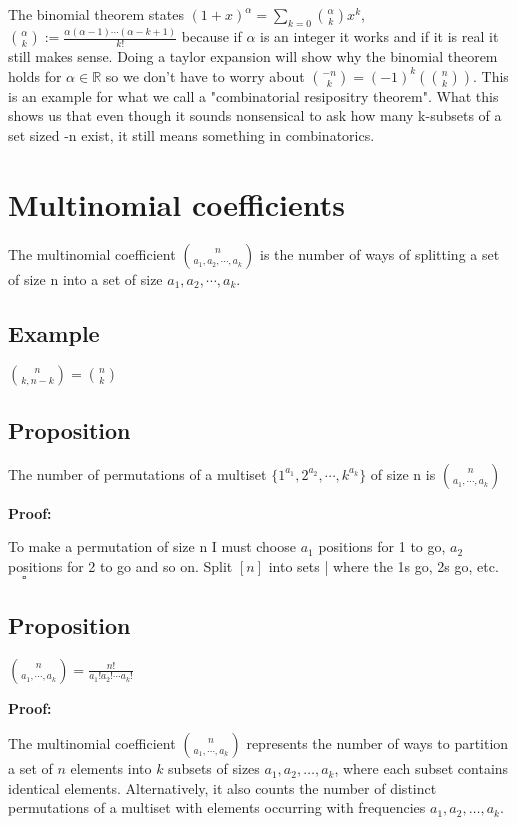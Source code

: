 \documentclass[12pt]{article}
\begin{document}
\noindent 
The binomial theorem states \((1+x)^\alpha = \sum_{k=0} \binom{\alpha}{k}x^k\),
\(\binom{\alpha}{k} := \frac{\alpha(\alpha - 1) \cdots (\alpha-k+1)}{k!} \)
because if \(\alpha\) is an integer it works and if it is real it still makes sense.
Doing a taylor expansion will show why the 
binomial theorem holds for \(\alpha \in \mathbb R\) so we don't have to worry 
about \(\binom{-n}{k} = (-1)^k (\binom{n}{k})\).
This is an example for what we call a "combinatorial resipositry theorem". 
What this shows us that even though it sounds nonsensical to ask how many 
k-subsets of a set sized -n exist, it still means something in combinatorics.

\section{Multinomial coefficients}
The multinomial coefficient \(\binom{n}{a_1, a_2, \cdots, a_k}\)
is the number of ways of splitting a set of size n into a set of size 
\(a_1, a_2, \cdots, a_k \). 

\subsection*{Example}
\(\binom{n}{k, n-k} = \binom{n}{k}\)

\subsection*{Proposition}
The number of permutations of a multiset 
\(\{1^{a_1}, 2^{a_2}, \cdots, k^{a_k}\}\) of size n is 
\(\binom{n}{a_1, \cdots, a_k}\)

\noindent 
\textbf{Proof:}

\noindent 
To make a permutation of size n I must choose $a_1$ positions for 1 to go,  
$a_2$ positions for 2 to go and so on. Split \([n]\) into sets | where the 1s go, 
2s go, etc. \(\quad \square\)

\subsection*{Proposition}
\(
\binom{n}{a_1,\cdots,a_k} = \frac{n!}{a_1! a_2! \cdots a_k!}
\)

\noindent
\textbf{Proof:}

\noindent 
The multinomial coefficient \(\binom{n}{a_1,\cdots, a_k}\) represents the number of ways to partition a set of \(n\) elements into \(k\) subsets of sizes \(a_1, a_2, \dots, a_k\), where each subset contains identical elements. Alternatively, it also counts the number of distinct permutations of a multiset with elements occurring with frequencies \(a_1, a_2, \dots, a_k\).
\end{document}

